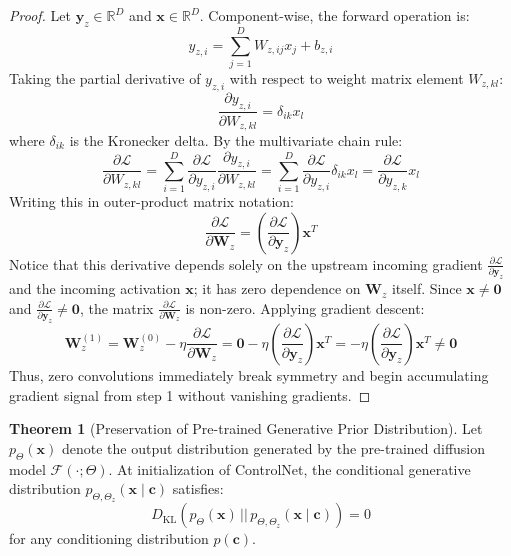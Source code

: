 \documentclass[11pt,a4paper]{article}
\theoremstyle{definition}
\newtheorem{theorem}{\textbf{Theorem}}[section]
\begin{document}
\begin{proof}
Let $\mathbf{y}_z \in \mathbb{R}^D$ and $\mathbf{x} \in \mathbb{R}^D$. Component-wise, the forward operation is:
{\boldmath
\begin{equation}
y_{z, i} = \sum_{j=1}^D W_{z, ij} x_j + b_{z, i}
\end{equation}
}
Taking the partial derivative of $y_{z, i}$ with respect to weight matrix element $W_{z, kl}$:
{\boldmath
\begin{equation}
\frac{\partial y_{z, i}}{\partial W_{z, kl}} = \delta_{ik} x_l
\end{equation}
}
where $\delta_{ik}$ is the Kronecker delta.
By the multivariate chain rule:
{\boldmath
\begin{equation}
\frac{\partial \mathcal{L}}{\partial W_{z, kl}} = \sum_{i=1}^D \frac{\partial \mathcal{L}}{\partial y_{z, i}} \frac{\partial y_{z, i}}{\partial W_{z, kl}} = \sum_{i=1}^D \frac{\partial \mathcal{L}}{\partial y_{z, i}} \delta_{ik} x_l = \frac{\partial \mathcal{L}}{\partial y_{z, k}} x_l
\end{equation}
}
Writing this in outer-product matrix notation:
{\boldmath
\begin{equation}
\frac{\partial \mathcal{L}}{\partial \mathbf{W}_z} = \left( \frac{\partial \mathcal{L}}{\partial \mathbf{y}_z} \right) \mathbf{x}^T
\end{equation}
}
Notice that this derivative depends solely on the upstream incoming gradient $\frac{\partial \mathcal{L}}{\partial \mathbf{y}_z}$ and the incoming activation $\mathbf{x}$; it has zero dependence on $\mathbf{W}_z$ itself.
Since $\mathbf{x} \ne \mathbf{0}$ and $\frac{\partial \mathcal{L}}{\partial \mathbf{y}_z} \ne \mathbf{0}$, the matrix $\frac{\partial \mathcal{L}}{\partial \mathbf{W}_z}$ is non-zero.
Applying gradient descent:
{\boldmath
\begin{equation}
\mathbf{W}_z^{(1)} = \mathbf{W}_z^{(0)} - \eta \frac{\partial \mathcal{L}}{\partial \mathbf{W}_z} = \mathbf{0} - \eta \left( \frac{\partial \mathcal{L}}{\partial \mathbf{y}_z} \right) \mathbf{x}^T = -\eta \left( \frac{\partial \mathcal{L}}{\partial \mathbf{y}_z} \right) \mathbf{x}^T \ne \mathbf{0}
\end{equation}
}
Thus, zero convolutions immediately break symmetry and begin accumulating gradient signal from step 1 without vanishing gradients.
\end{proof}

\begin{theorem}[Preservation of Pre-trained Generative Prior Distribution]
Let $p_{\Theta}(\mathbf{x})$ denote the output distribution generated by the pre-trained diffusion model $\mathcal{F}(\cdot; \Theta)$. At initialization of ControlNet, the conditional generative distribution $p_{\Theta, \Theta_z}(\mathbf{x} \mid \mathbf{c})$ satisfies:
{\boldmath
\begin{equation}
D_{\text{KL}}\left( p_{\Theta}(\mathbf{x}) \,||\, p_{\Theta, \Theta_z}(\mathbf{x} \mid \mathbf{c}) \right) = 0
\end{equation}
}
for any conditioning distribution $p(\mathbf{c})$.
\end{theorem}
\end{document}
